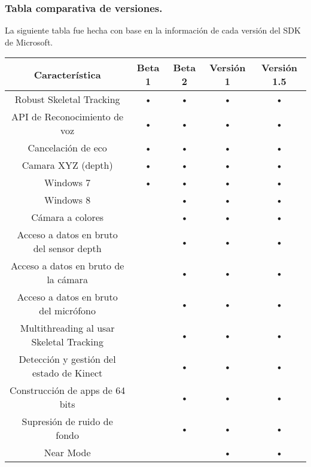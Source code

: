 \documentclass[11pt,a4paper]{article}
\begin{document}
\subsubsection{Tabla comparativa de versiones.}
La siguiente tabla fue hecha con base en la información de cada versión del SDK de Microsoft.
\newline
\newline%
\begin{tabular}{||c||c||c||c||c||}
\hline Característica                           & Beta 1 & Beta 2 & Versión 1 & Versión 1.5 \\ 
\hline Robust Skeletal Tracking                 & •      & •      & •         & •           \\ 
\hline API de Reconocimiento de voz             & •      & •      & •         & •           \\ 
\hline Cancelación de eco                       & •      & •      & •         & •           \\ 
\hline Camara XYZ (depth)                       & •      & •      & •         & •           \\ 
\hline Windows 7                                & •      & •      & •         & •           \\ 
\hline Windows 8                                &        & •      & •         & •           \\ 
\hline Cámara a colores                         &        & •      & •         & •           \\ 
\hline Acceso a datos en bruto del sensor depth &        & •      & •         & •           \\ 
\hline Acceso a datos en bruto de la cámara     &        & •      & •         & •           \\ 
\hline Acceso a datos en bruto del micrófono    &        & •      & •         & •           \\ 
\hline Multithreading al usar Skeletal Tracking &        & •      & •         & •           \\ 
\hline Detección y gestión del estado de Kinect &        & •      & •         & •           \\ 
\hline Construcción de apps de 64 bits          &        & •      & •         & •           \\ 
\hline Supresión de ruido de fondo              &        & •      & •         & •           \\ 
\hline Near Mode                                &        &        & •         & •           \\

\end{tabular}
\end{document}
